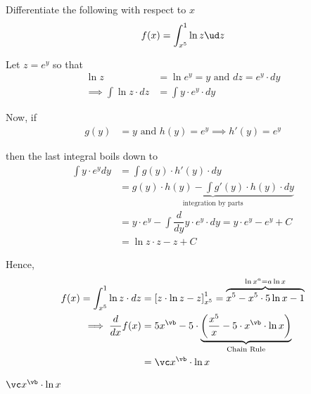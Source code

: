 

\SUBTRACT{}\vb
\SQUARE\va\vc


\question[2] Differentiate the following with respect to $x$
\[ f(x) = \int_{x^\va}^1 \ln z\ud z \] 

\watchout

\begin{solution}[\halfpage]
  Let $z=e^y$ so that 
  \begin{align}
    \ln z &= \ln e^y = y \text{ and } dz = e^y\cdot dy \\
    \implies\int \ln z\cdot dz &= \int y\cdot e^y\cdot dy
  \end{align}

  Now, if 
  \begin{align}
    g(y) &= y \text{ and } h(y) = e^y\implies h'(y) = e^y 
  \end{align} 

  then the last integral boils down to 
  \begin{align}
    \int y\cdot e^y dy &= \int g(y)\cdot h'(y)\cdot dy \\
    &= \underbrace{g(y)\cdot h(y)-\int g'(y)\cdot h(y)\cdot dy}_{\text{integration by parts}} \\
    &= y\cdot e^y - \int\dfrac{d}{dy}y\cdot e^y\cdot dy = y\cdot e^y - e^y + C \\
    &= \ln z\cdot z - z + C 
  \end{align} 

  Hence, 
  \begin{align}
    f(x) = \int_{x^\va}^1 \ln z\cdot dz &= \left[ z\cdot\ln z - z \right]_{x^\va}^1 
    = \overbrace{x^\va - x^\va\cdot\va \ln x - 1}^{\ln x^a = a\ln x} \\
    \implies \dfrac{d}{dx}f(x) &= \va x^\vb - \va\cdot\underbrace{\left( \dfrac{x^\va}{x} - \va\cdot x^\vb\cdot\ln x \right)}_{\text{Chain Rule}} \\
    &= \vc x^\vb\cdot\ln x
  \end{align}
\end{solution}

\ifprintanswers\begin{codex}$\vc x^\vb\cdot\ln x$\end{codex}\fi

